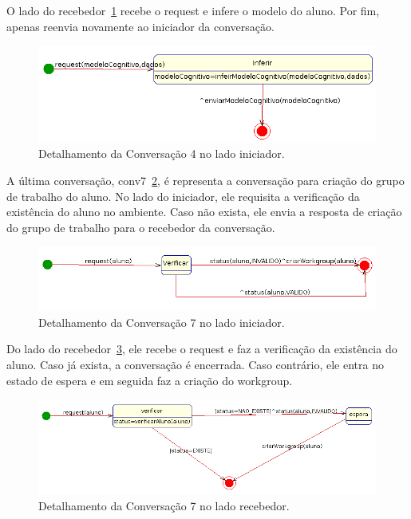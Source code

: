 O lado do recebedor~\ref{fig:conv4-recebedor} recebe o request e infere o modelo do aluno. Por fim, apenas reenvia novamente ao iniciador da conversação.
\begin{figure}
	\centering
	\includegraphics[scale=0.48]{images/conv4-recebedor.png}
	\caption{Detalhamento da Conversação 4 no lado iniciador.}
	\label{fig:conv4-recebedor}
\end{figure}

A última conversação, conv7~\ref{fig:conv7-iniciador}, é representa a conversação para criação do grupo de trabalho do aluno. No lado do iniciador, ele requisita a verificação da existência do aluno no ambiente. Caso não exista, ele envia a resposta de criação do grupo de trabalho para o recebedor da conversação.
\begin{figure}
	\centering
	\includegraphics[scale=0.48]{images/conv7-iniciador.png}
	\caption{Detalhamento da Conversação 7 no lado iniciador.}
	\label{fig:conv7-iniciador}
\end{figure}

Do lado do recebedor~\ref{fig:conv7-recebedor}, ele recebe o request e faz a verificação da existência do aluno. Caso já exista, a conversação é encerrada. Caso contrário, ele entra no estado de espera e em seguida faz a criação do workgroup.
\begin{figure}
	\centering
	\includegraphics[scale=0.48]{images/conv7-recebedor.png}
	\caption{Detalhamento da Conversação 7 no lado recebedor.}
	\label{fig:conv7-recebedor}
\end{figure}

